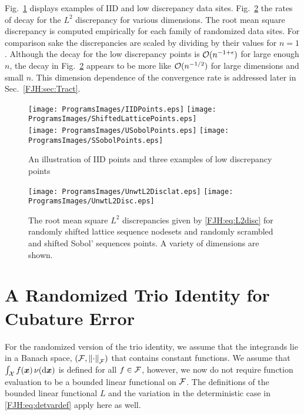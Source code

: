 \documentclass[graybox,footinfo]{svmult}
\begin{document}
Fig.\ \ref{FJH:fig:plotsdiffpts} displays examples of IID and low discrepancy data sites.  
Fig.\ \ref{FJH:fig:unwtdiscdiffpts} the rates of decay for the $L^2$ discrepancy for 
various dimensions.  The root mean square discrepancy is computed 
empirically for each family of randomized data sites.    For comparison sake the 
discrepancies are scaled by 
dividing by their values for $n=1$.  Although the 
decay for the low discrepancy points is 
${\mathcal{O}}(n^{-1+\epsilon})$ for large enough $n$, the decay in Fig.\ 
\ref{FJH:fig:unwtdiscdiffpts} appears to be 
more like ${\mathcal{O}}(n^{-1/2})$ for large dimensions and small $n$.   This dimension 
dependence of the convergence rate is addressed later in Sec.\  \ref{FJH:sec:Tract}. 


\begin{FJHLesson}
	\FJHLessonTwo
\end{FJHLesson}


\begin{figure}
	\centering
	\texttt{[image: ProgramsImages/IIDPoints.eps]} \qquad
	\texttt{[image: ProgramsImages/ShiftedLatticePoints.eps]} \\
	\texttt{[image: ProgramsImages/USobolPoints.eps]} \qquad
	\texttt{[image: ProgramsImages/SSobolPoints.eps]}
	\caption{An illustration of IID points and three examples of low discrepancy points 
	\label{FJH:fig:plotsdiffpts}}
\end{figure}

\begin{figure}
	\centering
	  \texttt{[image: ProgramsImages/UnwtL2Disclat.eps]}   
	  \qquad 
	  \texttt{[image: ProgramsImages/UnwtL2Disc.eps]} 
	\caption{The root mean square $L^2$ discrepancies given by \eqref{FJH:eq:L2disc} 
	for randomly shifted 
	lattice sequence nodesets and randomly scrambled and shifted Sobol' sequences 
	points.  A variety of dimensions are shown.
		\label{FJH:fig:unwtdiscdiffpts}}
\end{figure}

\section{A Randomized Trio Identity for Cubature Error} \label{FJH:sec:rndtrio}
For the randomized version of the trio identity, we assume that the integrands lie in 
a Banach space, $({\mathcal{F}},\left \lVert \cdot \right \rVert_{{\mathcal{F}}})$ that contains 
constant functions.  We assume
that $\int_{{\mathcal{X}}} f({\boldsymbol{x}}) \, \nu(\mathrm{d}{\boldsymbol{x}})$ is defined  for all $f \in {\mathcal{F}}$, however, we now 
do 
not require 
function evaluation to be a bounded linear functional on ${\mathcal{F}}$.  The definitions of the 
bounded linear functional $L$ and the variation in the deterministic case in  
\eqref{FJH:eq:detvardef} apply here as well.
\end{document}
